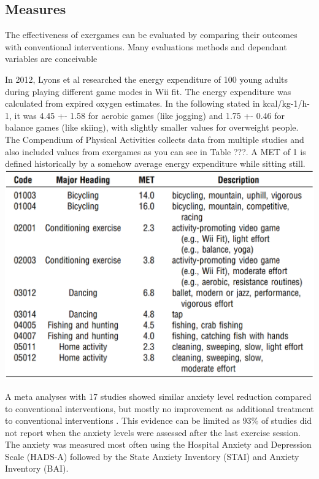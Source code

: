 \subsection{Measures}
The effectiveness of exergames can be evaluated by comparing their outcomes with conventional interventions. Many evaluations methods and dependant variables are conceivable 

In 2012, Lyons et al \cite{lyons2012novel} researched the energy expenditure of 100 young adults during playing different game modes in Wii fit. The energy expenditure was calculated from expired oxygen estimates. In the following stated in kcal/kg-1/h-1, it was 4.45 +- 1.58 for aerobic games (like jogging) and 1.75 +- 0.46 for balance games (like skiing), with slightly smaller values for overweight people. The Compendium of Physical Activities \cite{ainsworth20112011} collects data from multiple studies and also included values from exergames as you can see in Table ???. A MET of 1 is defined historically by a somehow average energy expenditure while sitting still.
\includegraphics[width=\linewidth]{"MET-physical-activities.png"}

A meta analyses with 17 studies showed similar anxiety level reduction compared to conventional interventions, but mostly no improvement as additional treatment to conventional interventions \cite{viana2020effects}. This evidence can be limited as 93\% of studies did not report when the anxiety levels were assessed after the last exercise session. The anxiety was measured most often using the Hospital Anxiety and Depression Scale (HADS-A) followed by the State Anxiety Inventory (STAI) and Anxiety Inventory (BAI).

